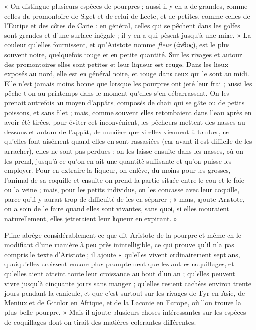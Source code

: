 \documentclass[a4paper, 11pt, oneside, polutonikogreek, french]{article}
\begin{document}
« On distingue plusieurs espèces de pourpres ; aussi il y en a de grandes, comme celles du promontoire de Siget et de celui de Lecte, et de petites, comme celles de l'Euripe et des côtes de Carie : en général, celles qui se pêchent dans les golfes sont grandes et d'une surface inégale ; il y en a qui pèsent jusqu'à une mine. » La couleur qu'elles fournissent, et qu'Aristote nomme \emph{fleur} (ἀνθος), est le plus souvent noire, quelquefois rouge et en petite quantité. Sur les rivages et autour des promontoires elles sont petites et leur liqueur est rouge. Dans les lieux exposés au nord, elle est en général noire, et rouge dans ceux qui le sont au midi. Elle n'est jamais moins bonne que lorsque les pourpres ont jeté leur frai ; aussi les pêche-t-on au printemps dans le moment qu'elles s'en débarrassent. On les prenait autrefois au moyen d'appâts, composés de chair qui se gâte ou de petits poissons, et sans filet ; mais, comme souvent elles retombaient dans l'eau après en avoir été tirées, pour éviter cet inconvénient, les pêcheurs mettent des nasses au-dessous et autour de l'appât, de manière que si elles viennent à tomber, ce qu'elles font aisément quand elles en sont rassasiées (car avant il est difficile de les arracher), elles ne sont pas perdues : on les laisse ensuite dans les nasses, où on les prend, jusqu'à ce qu'on en ait une quantité suffisante et qu'on puisse les employer. Pour en extraire la liqueur, on enlève, du moins pour les grosses, l'animal de sa coquille et ensuite on prend la partie située entre le cou et le foie ou la veine ; mais, pour les petits individus, on les concasse avec leur coquille, parce qu'il y aurait trop de difficulté de les en séparer ; « mais, ajoute Aristote, on a soin de le faire quand elles sont vivantes, sans quoi, si elles mouraient naturellement, elles jetteraient leur liqueur en expirant. »

Pline abrège considérablement ce que dit Aristote de la pourpre et même en le modifiant d'une manière à peu près inintelligible, ce qui prouve qu'il n'a pas compris le texte d'Aristote ; il ajoute « qu'elles vivent ordinairement sept ans, quoiqu'elles croissent encore plus promptement que les autres coquillages, et qu'elles aient atteint toute leur croissance au bout d'un an ; qu'elles peuvent vivre jusqu'à cinquante jours sans manger ; qu'elles restent cachées environ trente jours pendant la canicule, et que c'est surtout sur les rivages de Tyr en Asie, de Meniux et de Gitulor en Afrique, et de la Laconie en Europe, où l'on trouve la plus belle pourpre. » Mais il ajoute plusieurs choses intéressantes sur les espèces de coquillages dont on tirait des matières colorantes différentes.
\end{document}
